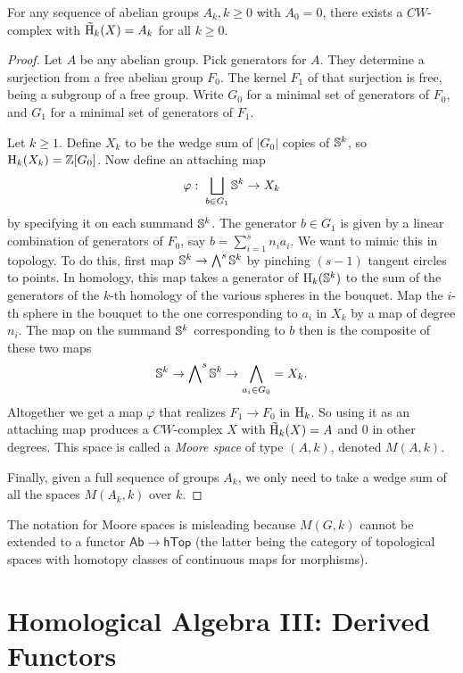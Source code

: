 \begin{prop}
    For any sequence of abelian groups $A_k,k\geq 0$ with $A_0=0$, there exists a $CW$-complex with $\wt{\rmH}_k(X)=A_k$ for all $k\geq 0$.
\end{prop}
\begin{proof}
    Let $A$ be any abelian group. Pick generators for $A$. They determine a surjection from a free abelian group $F_0$. The kernel $F_1$ of that surjection is free, being a subgroup of a free group. Write $G_0$ for a minimal set of generators of $F_0$, and $G_1$ for a minimal set of generators of $F_1$.

    Let $k\geq 1$. Define $X_k$ to be the wedge sum of $|G_0|$ copies of $\mathbb{S}^k$, so $\mathrm{H}_k(X_k)=\mathbb{Z}[G_0]$. Now define an attaching map
    \[\varphi:\;\bigsqcup_{b\in G_1}\mathbb{S}^k\to X_k\]
    by specifying it on each summand $\mathbb{S}^k$. The generator $b\in G_1$ is given by a linear combination of generators of $F_0$, say $b=\sum_{i=1}^s n_i a_i$. We want to mimic this in topology. To do this, first map $\mathbb{S}^k\to \bigwedge\nolimits^s \mathbb{S}^k$ by pinching $(s-1)$ tangent circles to points. In homology, this map takes a generator of $\mathrm{H}_k(\mathbb{S}^k)$ to the sum of the generators of the $k$-th homology of the various spheres in the bouquet. Map the $i$-th sphere in the bouquet to the one corresponding to $a_i$ in $X_k$ by a map of degree $n_i$. The map on the summand $\mathbb{S}^k$ corresponding to $b$ then is the composite of these two maps
    \[\mathbb{S}^k\to \bigwedge\nolimits^s \mathbb{S}^k\to \bigwedge_{a_i\in G_0}=X_k.\]
    Altogether we get a map $\varphi$ that realizes $F_1\to F_0$ in $\mathrm{H}_k$. So using it as an attaching map produces a $CW$-complex $X$ with $\wt{\rmH}_k(X)=A$ and $0$ in other degrees. This space is called a \emph{Moore space} of type $(A,k)$, denoted $M(A,k)$.

    Finally, given a full sequence of groups $A_k$, we only need to take a wedge sum of all the spaces $M(A_k,k)$ over $k$.
\end{proof}

\begin{rem}
    The notation for Moore spaces is misleading because $M(G,k)$ cannot be extended to a functor $\mathsf{Ab}\to \mathsf{hTop}$ (the latter being the category of topological spaces with homotopy classes of continuous maps for morphisms).
\end{rem}




\clearpage
\chapter{Homological Algebra III: Derived Functors}

